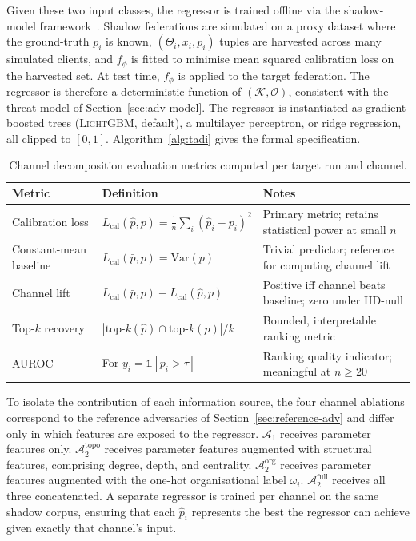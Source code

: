 \documentclass[letterpaper,journal]{IEEEtran}
\begin{document}
Given these two input classes, the regressor is trained offline via
the shadow-model framework~\cite{shokri2017membership}. Shadow
federations are simulated on a proxy dataset where the ground-truth
$p_i$ is known, $(\Theta_i, x_i, p_i)$ tuples are harvested across
many simulated clients, and $f_\phi$ is fitted to minimise mean
squared calibration loss on the harvested set. At test time,
$f_\phi$ is applied to the target federation. The regressor is
therefore a deterministic function of $(\mathcal{K}, \mathcal{O})$,
consistent with the threat model of Section~\ref{sec:adv-model}. The regressor is instantiated as gradient-boosted trees (\textsc{LightGBM}, default), a multilayer perceptron, or ridge regression, all clipped to $[0,1]$. Algorithm~\ref{alg:tadi}
gives the formal specification.

\begin{table}[t]
\centering
\caption{Channel decomposition evaluation metrics computed per
target run and channel.}
\label{tab:metrics}
\begin{tabular}{@{}lll@{}}
\toprule
Metric & Definition & Notes \\
\midrule
Calibration loss &
$L_{\text{cal}}(\hat{p}, p) = \frac{1}{n}\sum_i (\hat{p}_i - p_i)^2$ &
Primary metric; retains statistical power at small $n$ \\
Constant-mean baseline &
$L_{\text{cal}}(\bar{p}, p) = \mathrm{Var}(p)$ &
Trivial predictor; reference for computing channel lift \\
Channel lift &
$L_{\text{cal}}(\bar{p}, p) - L_{\text{cal}}(\hat{p}, p)$ &
Positive iff channel beats baseline; zero under IID-null \\
Top-$k$ recovery &
$|\text{top-}k(\hat{p}) \cap \text{top-}k(p)| / k$ &
Bounded, interpretable ranking metric \\
AUROC &
For $y_i = \mathbb{1}[p_i > \tau]$ &
Ranking quality indicator; meaningful at $n \geq 20$ \\
\bottomrule
\end{tabular}
\end{table}

To isolate the contribution of each information source, the four
channel ablations correspond to the reference adversaries of
Section~\ref{sec:reference-adv} and differ only in which features
are exposed to the regressor. $\mathcal{A}_1$ receives parameter
features only. $\mathcal{A}_2^{\text{topo}}$ receives parameter
features augmented with structural features, comprising degree,
depth, and centrality. $\mathcal{A}_2^{\text{org}}$ receives
parameter features augmented with the one-hot organisational label
$\omega_i$. $\mathcal{A}_2^{\text{full}}$ receives all three
concatenated. A separate regressor is trained per channel on the
same shadow corpus, ensuring that each $\hat{p}_i$ represents the
best the regressor can achieve given exactly that channel's input.
\end{document}
